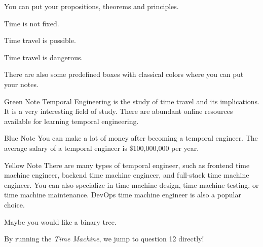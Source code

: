 

You can put your propositions, theorems and principles.
\begin{proposition}
    Time is not fixed.
\end{proposition}

\begin{theorem}
    Time travel is possible.
\end{theorem}

\begin{principle}
    Time travel is dangerous.
\end{principle}

There are also some predefined boxes with classical colors where you can put your notes. 
\begin{greenbox}{Green Note}
    Temporal Engineering is the study of time travel and its implications. It is a very interesting field of study. There are abundant online resources available for learning temporal engineering.
\end{greenbox}

\begin{bluebox}{Blue Note}
    You can make a lot of money after becoming a temporal engineer. The average salary of a temporal engineer is \$100,000,000 per year.
\end{bluebox}

\begin{yellowbox}{Yellow Note}
    There are many types of temporal engineer, such as frontend time machine engineer, backend time machine engineer, and full-stack time machine engineer. You can also specialize in time machine design, time machine testing, or time machine maintenance. DevOps time machine engineer is also a popular choice.
\end{yellowbox}



    

\question{}
Maybe you would like a binary tree. \par
{}

By running the \textit{Time Machine}, we jump to question 12 directly!

